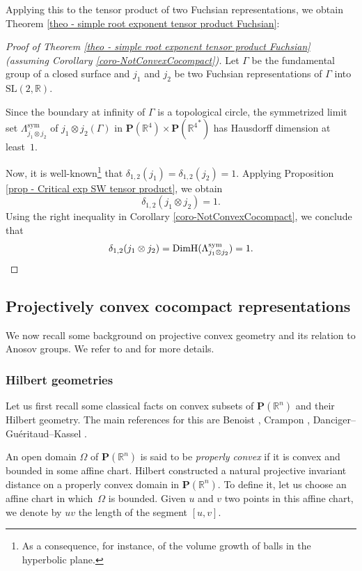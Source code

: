 \documentclass[11pt]{article}
\numberwithin{equation}{section}
\theoremstyle{definition}
\newcommand{\proj}{\mathbf{P}}
\newcommand{\R}{\mathbb{R}}
\newcommand{\SL}{\mathrm{SL}}
\DeclareMathOperator{\DimH}{DimH}
\begin{document}
Applying this to the tensor product of two Fuchsian representations, we obtain Theorem \ref{theo - simple root exponent tensor product Fuchsian}:

\begin{proof}[Proof of Theorem \ref{theo - simple root exponent tensor product Fuchsian} (assuming Corollary \ref{coro-NotConvexCocompact})]
Let $\Gamma$ be the fundamental group of a closed surface and $j_1$ and $j_2$ be two Fuchsian representations of $\Gamma$ into $\SL(2,\R)$.

Since the boundary at infinity of $\Gamma$ is a topological circle, the symmetrized limit set $\Lambda_{j_1\otimes j_2}^{\mathrm{sym}}$ of $j_1\otimes j_2(\Gamma)$ in $\proj(\R^4)\times \proj({\R^4}^*)$ has Hausdorff dimension at least~$1$.

Now, it is well-known\footnote{As a consequence, for instance, of the volume growth of balls in the hyperbolic plane.} that $\delta_{1,2}(j_1) = \delta_{1,2}(j_2) = 1$. Applying Proposition \ref{prop - Critical exp SW tensor product}, we obtain
\[\delta_{1,2}(j_1\otimes j_2) =1.\]
Using the right inequality in Corollary \ref{coro-NotConvexCocompact}, we conclude that
\[\delta_{1,2}(j_1\otimes j_2) = \DimH(\Lambda_{j_1\otimes j_2}^{\mathrm{sym}}) = 1.\qedhere\]
\end{proof}

\subsection{Projectively convex cocompact representations}\label{subsec - projectively cc representations}

We now recall some background on projective convex geometry and its relation to Anosov groups. We refer to \cite{DGK} and \cite{zimmer} for more details.

\subsubsection{Hilbert geometries}

Let us first recall some classical facts on convex subsets of $\proj(\R^n)$ and their Hilbert geometry. The main references for this are Benoist \cite{Benoist2001convexe}, Crampon \cite{crampon2009entropies,crampon2011dynamics}, Danciger--Guéritaud--Kassel \cite{DGK}.

An open domain $\Omega$ of $\proj(\R^n)$ is said to be \emph{properly convex} if it is convex and bounded in some affine chart. Hilbert constructed a natural projective invariant distance on a properly convex domain in $\proj(\R^n)$. To define it, let us choose an affine chart in which~$\Omega$ is bounded. Given $u$ and $v$ two points in this affine chart, we denote by $uv$ the length of the segment $[u,v]$.
\end{document}
